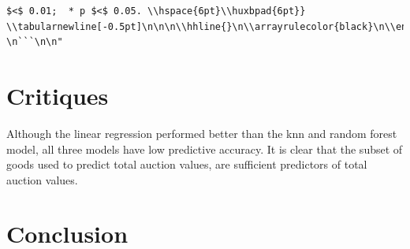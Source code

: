 \documentclass[11pt,preprint, authoryear]{elsarticle}
\numberwithin{equation}{section}
\numberwithin{figure}{section}
\numberwithin{table}{section}
\begin{document}
\begin{verbatim}
$<$ 0.01;  * p $<$ 0.05. \\hspace{6pt}\\huxbpad{6pt}} \\tabularnewline[-0.5pt]\n\n\n\\hhline{}\n\\arrayrulecolor{black}\n\\end{tabular}\n\\end{threeparttable}\\par\\end{centerbox}\n\n\\end{table}\n \n```\n\n"
\end{verbatim}

\hypertarget{critiques}{%
\section{Critiques}\label{critiques}}

Although the linear regression performed better than the knn and random
forest model, all three models have low predictive accuracy. It is clear
that the subset of goods used to predict total auction values, are
sufficient predictors of total auction values.

\hypertarget{conclusion}{%
\section{Conclusion}\label{conclusion}}


\end{document}
